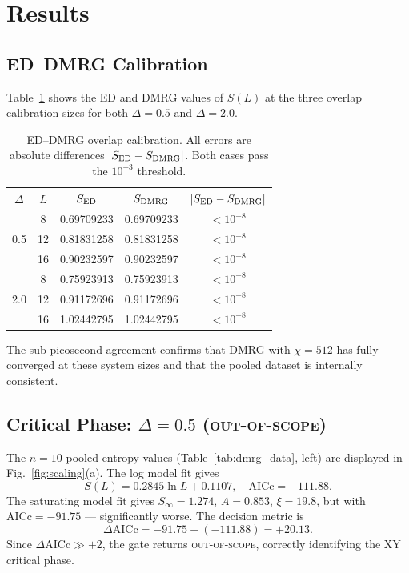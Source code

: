 \documentclass[11pt,letterpaper]{article}
\newcommand{\dAICc}{\Delta\mathrm{AICc}}
\newcommand{\Sinf}{S_{\infty}}
\newcommand{\outscope}{\textsc{out-of-scope}}
\begin{document}
\section{Results}
\label{sec:results}

\subsection{ED--DMRG Calibration}
\label{sec:cal}

Table~\ref{tab:cal} shows the ED and DMRG values of $S(L)$ at the three
overlap calibration sizes for both $\Delta = 0.5$ and $\Delta = 2.0$.

\begin{table}[h]
  \centering
  \caption{ED--DMRG overlap calibration.  All errors are absolute differences
           $|S_{\rm ED} - S_{\rm DMRG}|$.  Both cases pass the $10^{-3}$ threshold.}
  \label{tab:cal}
  \begin{tabular}{ccccc}
    \toprule
    $\Delta$ & $L$ & $S_{\rm ED}$ & $S_{\rm DMRG}$ & $|S_{\rm ED}-S_{\rm DMRG}|$ \\
    \midrule
    \multirow{3}{*}{0.5}
      & 8  & 0.69709233 & 0.69709233 & $< 10^{-8}$ \\
      & 12 & 0.81831258 & 0.81831258 & $< 10^{-8}$ \\
      & 16 & 0.90232597 & 0.90232597 & $< 10^{-8}$ \\
    \midrule
    \multirow{3}{*}{2.0}
      & 8  & 0.75923913 & 0.75923913 & $< 10^{-8}$ \\
      & 12 & 0.91172696 & 0.91172696 & $< 10^{-8}$ \\
      & 16 & 1.02442795 & 1.02442795 & $< 10^{-8}$ \\
    \bottomrule
  \end{tabular}
\end{table}

The sub-picosecond agreement confirms that DMRG with $\chi=512$ has fully
converged at these system sizes and that the pooled dataset is internally
consistent.

\subsection{Critical Phase: $\Delta = 0.5$ (\outscope)}
\label{sec:delta05}

The $n=10$ pooled entropy values (Table~\ref{tab:dmrg_data}, left) are
displayed in Fig.~\ref{fig:scaling}(a).  The log model fit gives
\begin{equation}
  S(L) = 0.2845\ln L + 0.1107,\quad \mathrm{AICc} = -111.88.
  \label{eq:logfit05}
\end{equation}
The saturating model fit gives $\Sinf = 1.274$, $A = 0.853$,
$\xi = 19.8$, but with $\mathrm{AICc} = -91.75$ — significantly worse.
The decision metric is
\begin{equation}
  \dAICc = -91.75 - (-111.88) = +20.13.
  \label{eq:daicc05}
\end{equation}
Since $\dAICc \gg +2$, the gate returns \outscope, correctly identifying
the XY critical phase.
\end{document}
